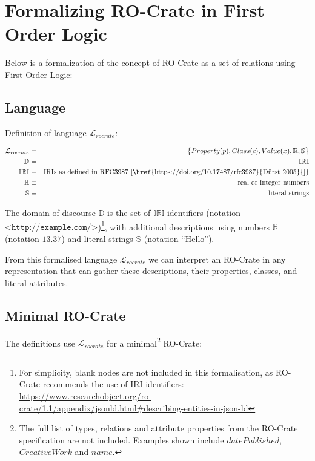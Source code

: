 \section{Formalizing RO-Crate in First Order Logic}

\label{sec:formaldefinition}

Below is a formalization of the concept of RO-Crate as a set of relations using First Order Logic:

\subsection{Language}

Definition of language $\mathcal{L}_{rocrate}$:

\begin{eqnarray*}
    \mathcal{L}_{rocrate}   & = & \big\{ Property(p), Class(c),
                            Value(x), \mathbb{R}, \mathbb{S} \big\} \\
    \mathbb{D}              & = & \mathbb{IRI} \\
    \mathbb{IRI}            & \equiv & { \text{IRIs as defined in RFC3987 {[}\href{https://doi.org/10.17487/rfc3987}{Dürst 2005}{]}} } \\
    \mathbb{R}              & \equiv & { \text{real or integer numbers} } \\
    \mathbb{S}              & \equiv & { \text{literal strings} }
\end{eqnarray*}


The domain of discourse $\mathbb{D}$ is the set of $\mathbb{IRI}$ identifiers (notation $\texttt{<http://example.com/>}$)\footnote{
    For simplicity, blank nodes are not included in this formalisation, as RO-Crate
    recommends the use of IRI identifiers: \url{https://www.researchobject.org/ro-crate/1.1/appendix/jsonld.html\#describing-entities-in-json-ld}
}, with additional descriptions using numbers $\mathbb{R}$ (notation $13.37$) and literal strings $\mathbb{S}$ (notation $\text{“Hello”}$).

From this formalised language $\mathcal{L}_{rocrate}$ we can interpret an RO-Crate in any representation that can gather these descriptions, their properties, classes, and literal attributes.

\subsection{Minimal RO-Crate}

The definitions  use $\mathcal{L}_{rocrate}$ for a minimal\footnote{
    The full list of types, relations and attribute properties from the RO-Crate specification are not included. Examples shown include $datePublished$, $CreativeWork$ and $name$.
} RO-Crate:


